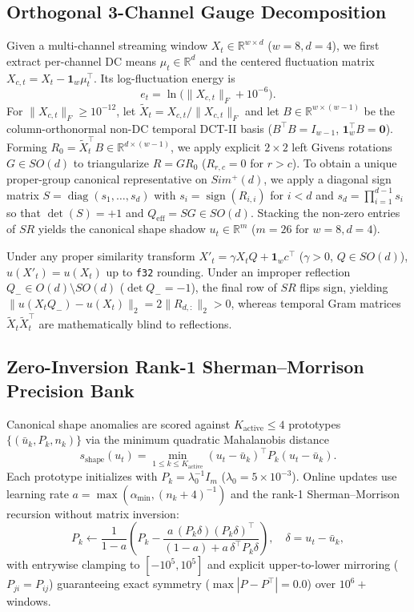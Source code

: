 \documentclass[conference]{IEEEtran}
\begin{document}
\subsection{Orthogonal 3-Channel Gauge Decomposition}
Given a multi-channel streaming window $X_t \in \mathbb{R}^{w \times d}$ ($w=8, d=4$), we first extract per-channel DC means $\mu_t \in \mathbb{R}^d$ and the centered fluctuation matrix $X_{c,t} = X_t - \mathbf{1}_w \mu_t^\top$. Its log-fluctuation energy is
\begin{equation}
  e_t = \ln\bigl(\|X_{c,t}\|_F + 10^{-6}\bigr).
\end{equation}
For $\|X_{c,t}\|_F \ge 10^{-12}$, let $\tilde{X}_t = X_{c,t}/\|X_{c,t}\|_F$ and let $B \in \mathbb{R}^{w \times (w-1)}$ be the column-orthonormal non-DC temporal DCT-II basis ($B^\top B = I_{w-1}$, $\mathbf{1}_w^\top B = \mathbf{0}$). Forming $R_0 = \tilde{X}_t^\top B \in \mathbb{R}^{d \times (w-1)}$, we apply explicit $2\times 2$ left Givens rotations~\cite{golub2013matrix} $G \in SO(d)$ to triangularize $R = G R_0$ ($R_{r,c}=0$ for $r>c$). To obtain a unique proper-group canonical representative on $Sim^+(d)$, we apply a diagonal sign matrix $S = \operatorname{diag}(s_1,\dots,s_d)$ with $s_i = \operatorname{sign}(R_{i,i})$ for $i < d$ and $s_d = \prod_{i=1}^{d-1} s_i$ so that $\det(S)=+1$ and $Q_{\text{eff}} = SG \in SO(d)$. Stacking the non-zero entries of $S R$ yields the canonical shape shadow $u_t \in \mathbb{R}^m$ ($m=26$ for $w=8, d=4$).

Under any proper similarity transform $X'_t = \gamma X_t Q + \mathbf{1}_w c^\top$ ($\gamma > 0$, $Q \in SO(d)$), $u(X'_t) = u(X_t)$ up to \texttt{f32} rounding. Under an improper reflection $Q_- \in O(d)\setminus SO(d)$ ($\det Q_- = -1$), the final row of $S R$ flips sign, yielding $\|u(X_t Q_-) - u(X_t)\|_2 = 2\|R_{d,:}\|_2 > 0$, whereas temporal Gram matrices $\tilde{X}_t \tilde{X}_t^\top$ are mathematically blind to reflections.

\subsection{Zero-Inversion Rank-1 Sherman--Morrison Precision Bank}
Canonical shape anomalies are scored against $K_{\text{active}} \le 4$ prototypes $\{(\bar{u}_k, P_k, n_k)\}$ via the minimum quadratic Mahalanobis distance
\begin{equation}
  s_{\text{shape}}(u_t) = \min_{1 \le k \le K_{\text{active}}} (u_t - \bar{u}_k)^\top P_k (u_t - \bar{u}_k).
\end{equation}
Each prototype initializes with $P_k = \lambda_0^{-1} I_m$ ($\lambda_0 = 5\times 10^{-3}$). Online updates use learning rate $a = \max(\alpha_{\min}, (n_k + 4)^{-1})$ and the rank-1 Sherman--Morrison recursion without matrix inversion:
\begin{equation}
  P_k \leftarrow \frac{1}{1-a}\left(P_k - \frac{a \, (P_k \delta)(P_k \delta)^\top}{(1-a) + a \, \delta^\top P_k \delta}\right), \quad \delta = u_t - \bar{u}_k,
\end{equation}
with entrywise clamping to $[-10^5, 10^5]$ and explicit upper-to-lower mirroring ($P_{ji} = P_{ij}$) guaranteeing exact symmetry ($\max |P - P^\top| = 0.0$) over $10^6+$ windows.
\end{document}
